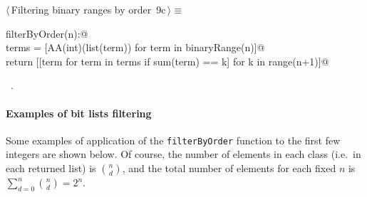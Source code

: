 \documentclass[11pt,oneside]{article}	%
\begin{document}
\begin{flushleft} \small \label{scrap13}
\protect{}$\langle\,$Filtering binary ranges by order\nobreak\ {\footnotesize 9c}$\,\rangle\equiv$
\vspace{-1ex}
\begin{list}{}{} \item
\mbox{}\verb@def filterByOrder(n):@\\
\mbox{}\verb@    terms = [AA(int)(list(term)) for term in binaryRange(n)]@\\
\mbox{}\verb@    return [[term for term in terms if sum(term) == k] for k in range(n+1)]@\\
\mbox{}\verb@@{\NWsep}
\end{list}
\vspace{-1ex}
\footnotesize\addtolength{\baselineskip}{-1ex}
\begin{list}{}{\setlength{\itemsep}{-\parsep}\setlength{\itemindent}{-\leftmargin}}
\item \NWtxtMacroRefIn\ .
\end{list}
\end{flushleft}

\paragraph{Examples of bit lists filtering}
Some examples of application of the \texttt{filterByOrder} function to the first few integers are shown below.
Of course, the number of elements in each class (i.e.~in each returned list) is ${n \choose d}$, and the total number of elements for each fixed $n$ is $\sum_{d=0}^n {n \choose d} = 2^n$.
\end{document}
